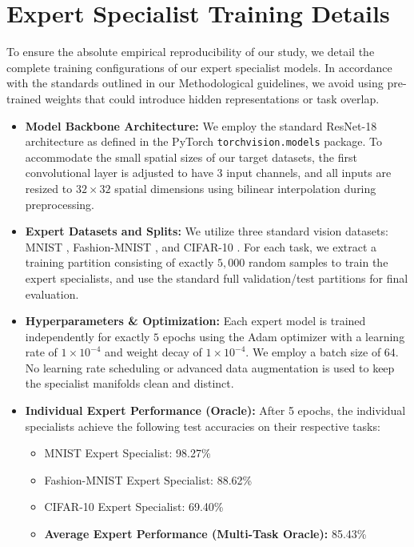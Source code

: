 \documentclass{article}
\theoremstyle{plain}
\theoremstyle{definition}
\theoremstyle{remark}
\begin{document}
\clearpage



\clearpage
\appendix
\onecolumn

\section{Expert Specialist Training Details}
\label{app:experts}
To ensure the absolute empirical reproducibility of our study, we detail the complete training configurations of our expert specialist models. In accordance with the standards outlined in our Methodological guidelines, we avoid using pre-trained weights that could introduce hidden representations or task overlap.
\begin{itemize}
    \item \textbf{Model Backbone Architecture:} We employ the standard ResNet-18 architecture \cite{He2016} as defined in the PyTorch \texttt{torchvision.models} package. To accommodate the small spatial sizes of our target datasets, the first convolutional layer is adjusted to have $3$ input channels, and all inputs are resized to $32 \times 32$ spatial dimensions using bilinear interpolation during preprocessing.
    \item \textbf{Expert Datasets and Splits:} We utilize three standard vision datasets: MNIST \cite{LeCun1998}, Fashion-MNIST \cite{Xiao2017}, and CIFAR-10 \cite{Krizhevsky2009}. For each task, we extract a training partition consisting of exactly $5,000$ random samples to train the expert specialists, and use the standard full validation/test partitions for final evaluation.
    \item \textbf{Hyperparameters \& Optimization:} Each expert model is trained independently for exactly $5$ epochs using the Adam optimizer \cite{Kingma2014} with a learning rate of $1 \times 10^{-4}$ and weight decay of $1 \times 10^{-4}$. We employ a batch size of $64$. No learning rate scheduling or advanced data augmentation is used to keep the specialist manifolds clean and distinct.
    \item \textbf{Individual Expert Performance (Oracle):} After 5 epochs, the individual specialists achieve the following test accuracies on their respective tasks:
    \begin{itemize}
        \item MNIST Expert Specialist: 98.27\%
        \item Fashion-MNIST Expert Specialist: 88.62\%
        \item CIFAR-10 Expert Specialist: 69.40\%
        \item \textbf{Average Expert Performance (Multi-Task Oracle):} 85.43\%
    \end{itemize}
\end{itemize}
\end{document}
